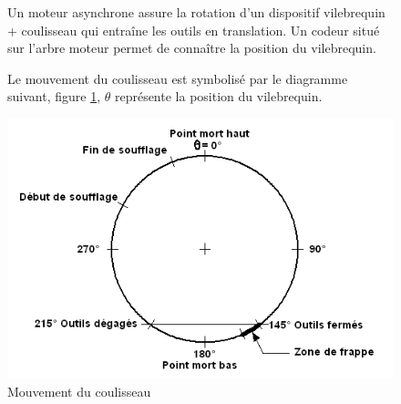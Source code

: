 \begin{figure}[htbp]
\begin{minipage}[c]{.65\linewidth}
Un moteur asynchrone assure la rotation d'un dispositif \og vilebrequin + coulisseau \fg qui entraîne les outils en translation. Un codeur situé sur l'arbre moteur permet de connaître la position du vilebrequin.

Le mouvement du coulisseau est symbolisé par le diagramme suivant, figure \ref{fig:image15}, $\theta$ représente la position du vilebrequin.
\end{minipage}
\hfill
\begin{minipage}[c]{.3\linewidth}
\begin{center}
\includegraphics[width=\linewidth]{img/Poinc1.png}
\caption{Mouvement du coulisseau}
\label{fig:image15}
\end{center}
\end{minipage}
\end{figure}

